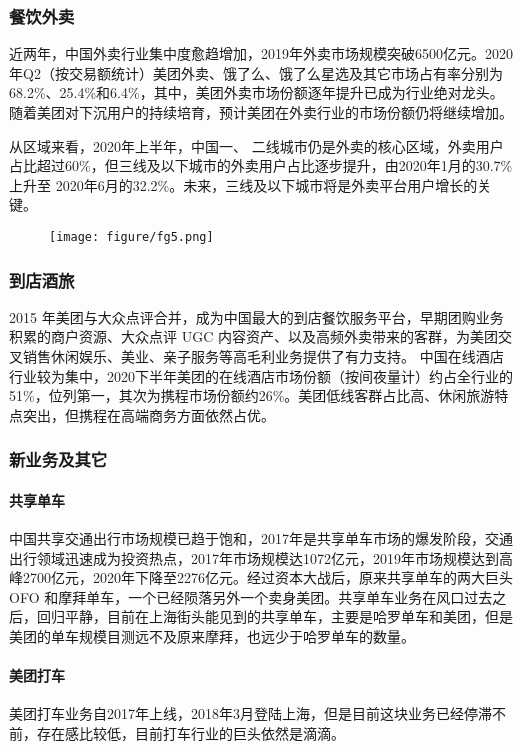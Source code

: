 \documentclass[UTF8,a4paper,12pt,lang=cn,fontset = windows]{elegantpaper} %
\begin{document}
\subsubsection{餐饮外卖}
近两年，中国外卖行业集中度愈趋增加，2019年外卖市场规模突破6500亿元。2020年Q2（按交易额统计）美团外卖、饿了么、饿了么星选及其它市场占有率分别为68.2\%、25.4\%和6.4\%，其中，美团外卖市场份额逐年提升已成为行业绝对龙头。随着美团对下沉用户的持续培育，预计美团在外卖行业的市场份额仍将继续增加。

从区域来看，2020年上半年，中国一、 二线城市仍是外卖的核心区域，外卖用户占比超过60\%，但三线及以下城市的外卖用户占比逐步提升，由2020年1月的30.7\%上升至 2020年6月的32.2\%。未来，三线及以下城市将是外卖平台用户增长的关键。
\begin{figure}[htbp]
  \centering
  \texttt{[image: figure/fg5.png]}
  \end{figure}

\subsubsection{到店酒旅}
2015 年美团与大众点评合并，成为中国最大的到店餐饮服务平台，早期团购业务积累的商户资源、大众点评 UGC 内容资产、以及高频外卖带来的客群，为美团交叉销售休闲娱乐、美业、亲子服务等高毛利业务提供了有力支持。
中国在线酒店行业较为集中，2020下半年美团的在线酒店市场份额（按间夜量计）约占全行业的51\%，位列第一，其次为携程市场份额约26\%。美团低线客群占比高、休闲旅游特点突出，但携程在高端商务方面依然占优。
\subsubsection{新业务及其它}
\paragraph{共享单车} 中国共享交通出行市场规模已趋于饱和，2017年是共享单车市场的爆发阶段，交通出行领域迅速成为投资热点，2017年市场规模达1072亿元，2019年市场规模达到高峰2700亿元，2020年下降至2276亿元。经过资本大战后，原来共享单车的两大巨头 OFO 和摩拜单车，一个已经陨落另外一个卖身美团。共享单车业务在风口过去之后，回归平静，目前在上海街头能见到的共享单车，主要是哈罗单车和美团，但是美团的单车规模目测远不及原来摩拜，也远少于哈罗单车的数量。
\paragraph{美团打车} 美团打车业务自2017年上线，2018年3月登陆上海，但是目前这块业务已经停滞不前，存在感比较低，目前打车行业的巨头依然是滴滴。
\end{document}
